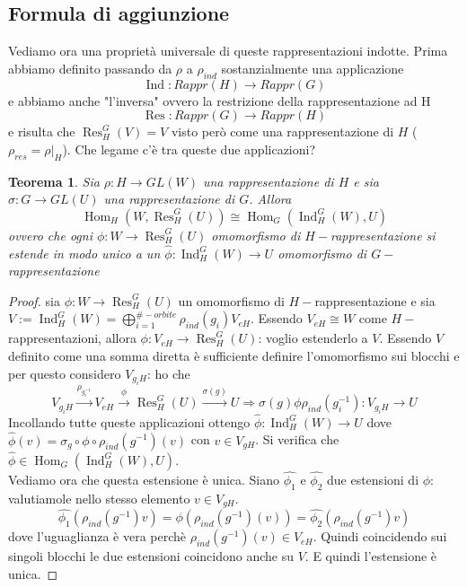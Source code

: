 \documentclass[11pt]{article}
\theoremstyle{plain}
\newtheorem{thm}{Teorema}[section]
\theoremstyle{definition}
\theoremstyle{remark}
\DeclareMathOperator{\Hom}{Hom}
\DeclareMathOperator{\Ind}{Ind}
\DeclareMathOperator{\Res}{Res}
\begin{document}
\subsection{Formula di aggiunzione}
Vediamo ora una proprietà universale di queste rappresentazioni indotte. Prima abbiamo definito passando da $\rho$ a $\rho_{ind}$ sostanzialmente una applicazione
\[\Ind:Rappr(H)\rightarrow Rappr(G)\]
e abbiamo anche "l'inversa" ovvero la restrizione della rappresentazione ad H
\[\Res:Rappr(G)\rightarrow Rappr(H)\]
e risulta che $\Res_H^G(V)=V$ visto però come una rappresentazione di $H$ ($\rho_{res}=\rho|_H$). Che legame c'è tra queste due applicazioni? 
\begin{thm}
Sia $\rho:H\rightarrow GL(W)$ una rappresentazione di $H$ e sia $\sigma:G\rightarrow GL(U)$ una rappresentazione di $G$. Allora
\[\Hom_H(W,\Res_H^G(U))\cong \Hom_G(\Ind_H^G(W),U)\]
ovvero che ogni $\phi:W\rightarrow \Res_H^G(U)$ omomorfismo di $H-$rappresentazione si estende in modo unico a un $\hat{\phi}:\Ind_H^G(W)\rightarrow U$ omomorfismo di $G-$rappresentazione
\end{thm}
\begin{proof} sia $\phi:W\rightarrow \Res_H^G(U)$ un omomorfismo di $H-$rappresentazione e sia $V:=\Ind_H^G(W)=\bigoplus_{i=1}^{\#-orbite} \rho_{ind}(g_i)V_{eH}$. Essendo $V_{eH}\cong W$ come $H-$rappresentazioni, allora $\phi:V_{eH}\rightarrow \Res_H^G(U)$: voglio estenderlo a $V$. Essendo $V$ definito come una somma diretta è sufficiente definire l'omomorfismo sui blocchi e per questo considero $V_{g_iH}$: ho che
\[V_{g_iH}\overset{\rho_{g_i^{-1}}}{\rightarrow} V_{eH}\overset{\phi}{\rightarrow} \Res_H^G(U)\overset{\sigma(g)}{\rightarrow} U\Rightarrow \sigma(g)\phi\rho_{ind}(g_i^{-1}):V_{g_iH}\rightarrow U\] 
Incollando tutte queste applicazioni ottengo $\hat{\phi}:\Ind_H^G(W)\rightarrow U$ dove
$\hat{\phi}(v)=\sigma_{g}\circ \phi\circ \rho_{ind}(g^{-1})(v)$ con $v\in V_{gH}$. Si verifica che $\hat{\phi}\in \Hom_G(\Ind_H^G(W),U)$. \\
Vediamo ora che questa estensione è unica. Siano $\hat{\phi_1}$ e $\hat{\phi_2}$ due estensioni di $\phi$: valutiamole nello stesso elemento $v\in V_{gH}$.
\[\hat{\phi_1}(\rho_{ind}(g^{-1})v)=\phi(\rho_{ind}(g^{-1})(v))=\hat{\phi_2}(\rho_{ind}(g^{-1})v)\]
dove l'uguaglianza è vera perchè $\rho_{ind}(g^{-1})(v)\in V_{eH}$. Quindi coincidendo sui singoli blocchi le due estensioni coincidono anche su $V$. E quindi l'estensione è unica. 


\end{proof}
\end{document}
